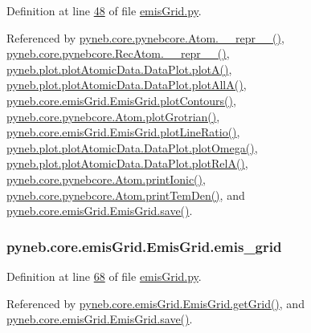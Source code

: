 Definition at line \hyperlink{emis_grid_8py_source_l00048}{48} of file \hyperlink{emis_grid_8py_source}{emis\-Grid.\-py}.



Referenced by \hyperlink{pynebcore_8py_source_l02615}{pyneb.\-core.\-pynebcore.\-Atom.\-\_\-\-\_\-repr\-\_\-\-\_\-()}, \hyperlink{pynebcore_8py_source_l03154}{pyneb.\-core.\-pynebcore.\-Rec\-Atom.\-\_\-\-\_\-repr\-\_\-\-\_\-()}, \hyperlink{plot_atomic_data_8py_source_l00117}{pyneb.\-plot.\-plot\-Atomic\-Data.\-Data\-Plot.\-plot\-A()}, \hyperlink{plot_atomic_data_8py_source_l00189}{pyneb.\-plot.\-plot\-Atomic\-Data.\-Data\-Plot.\-plot\-All\-A()}, \hyperlink{emis_grid_8py_source_l00182}{pyneb.\-core.\-emis\-Grid.\-Emis\-Grid.\-plot\-Contours()}, \hyperlink{pynebcore_8py_source_l02443}{pyneb.\-core.\-pynebcore.\-Atom.\-plot\-Grotrian()}, \hyperlink{emis_grid_8py_source_l00241}{pyneb.\-core.\-emis\-Grid.\-Emis\-Grid.\-plot\-Line\-Ratio()}, \hyperlink{plot_atomic_data_8py_source_l00373}{pyneb.\-plot.\-plot\-Atomic\-Data.\-Data\-Plot.\-plot\-Omega()}, \hyperlink{plot_atomic_data_8py_source_l00262}{pyneb.\-plot.\-plot\-Atomic\-Data.\-Data\-Plot.\-plot\-Rel\-A()}, \hyperlink{pynebcore_8py_source_l02233}{pyneb.\-core.\-pynebcore.\-Atom.\-print\-Ionic()}, \hyperlink{pynebcore_8py_source_l02324}{pyneb.\-core.\-pynebcore.\-Atom.\-print\-Tem\-Den()}, and \hyperlink{emis_grid_8py_source_l00099}{pyneb.\-core.\-emis\-Grid.\-Emis\-Grid.\-save()}.

\hypertarget{classpyneb_1_1core_1_1emis_grid_1_1_emis_grid_a6fd6b209384aaa2cd4ba5051477e4ecb}{
\subsubsection[{emis\-\_\-grid}]{\setlength{\rightskip}{0pt plus 5cm}pyneb.\-core.\-emis\-Grid.\-Emis\-Grid.\-emis\-\_\-grid}}\label{classpyneb_1_1core_1_1emis_grid_1_1_emis_grid_a6fd6b209384aaa2cd4ba5051477e4ecb}


Definition at line \hyperlink{emis_grid_8py_source_l00068}{68} of file \hyperlink{emis_grid_8py_source}{emis\-Grid.\-py}.



Referenced by \hyperlink{emis_grid_8py_source_l00114}{pyneb.\-core.\-emis\-Grid.\-Emis\-Grid.\-get\-Grid()}, and \hyperlink{emis_grid_8py_source_l00099}{pyneb.\-core.\-emis\-Grid.\-Emis\-Grid.\-save()}.

